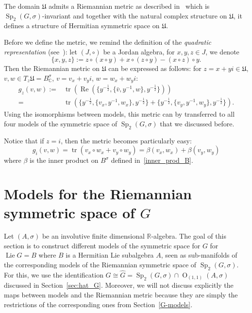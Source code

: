 \documentclass[a4paper,oneside,11pt]{amsart}
\DeclareMathOperator{\Sp}{Sp}
\DeclareMathOperator{\OO}{O}
\DeclareMathOperator{\Lie}{Lie}
\DeclareMathOperator{\Ree}{Re}
\DeclareMathOperator{\tr}{tr}
\newcommand{\R}{\mathbb R}
\theoremstyle{plain}
\theoremstyle{definition}
\theoremstyle{remark}
\newcommand{\defin}{\emph}
\begin{document}
The domain $\mathfrak U$ admits a Riemannian metric as described in~\cite[Excercise~8, Chapter~XIII]{Faraut} which is $\Sp_2(G,\sigma)$-invariant and together with the natural complex structure on $\mathfrak U$, it defines a structure of Hermitian symmetric space on $\mathfrak U$. 

Before we define the metric, we remind the definition of the \defin{quadratic representation} (see~\cite[Section~II.3]{Faraut}): let $(J,\circ)$ be a Jordan algebra, for $x,y,z\in J$, we denote 
$$\{x,y,z\}:=z\circ(x\circ y)+x\circ(z\circ y)-(x\circ z)\circ y.$$ 
Then the Riemannian metric on $\mathfrak U$ can be expressed as follows: for $z=x+yi\in \mathfrak U$, $v,w\in T_z\mathfrak U=B^\sigma_\mathbb C$, $v=v_x+v_yi$, $w=w_x+w_yi$:
\begin{align*}
    g_z(v,w):=&\tr\left(\Ree\left(\{y^{-\frac{1}{2}},\{\bar v,y^{-1},w\},y^{-\frac{1}{2}}\}\right)\right)\\
    =&\tr\left(\{y^{-\frac{1}{2}},\{v_x,y^{-1},w_x\},y^{-\frac{1}{2}}\}+\{y^{-\frac{1}{2}},\{v_y,y^{-1},w_y\},y^{-\frac{1}{2}}\}\right).    
\end{align*}
Using the isomorphisms between models, this metric can by transferred to all four models of the symmetric space of $\Sp_2(G,\sigma)$ that we discussed before.

Notice that if $z=i$, then the metric becomes particularly easy: 
$$g_i(v,w)=\tr(v_x\circ w_x+v_y\circ w_y)=\beta(v_x,w_x)+\beta(v_y,w_y)$$
where $\beta$ is the inner product on $B^\sigma$ defined in~\eqref{inner_prod_B}.


\section{Models for the Riemannian symmetric space of \texorpdfstring{$G$}{G}}\label{hatG-models}

Let $(A,\sigma)$ be an involutive finite dimensional $\R$-algebra. The goal of this section is to construct different models of the symmetric space for $G$ for $\Lie G=B$ where $B$ is a Hermitian Lie subalgebra $A$, seen as sub-manifolds of the corresponding models of the Riemannian symmetric space of $\Sp_2(G,\sigma)$. For this, we use the identification $G\cong \hat G=\Sp_2(G,\sigma)\cap\OO_{(1,1)}(A,\sigma)$ discussed in Section~\ref{sec:hat_G}. Moreover, we will not discuss explicitly the maps between models and the Riemannian metric because they are simply the restrictions of the corresponding ones from Section~\ref{G-models}.
\end{document}
